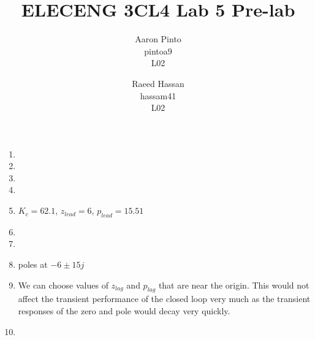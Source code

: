 \documentclass[12pt]{article}
\title{ELECENG 3CL4 Lab 5 Pre-lab}
\author{
    Aaron Pinto \\
    pintoa9 \\
    L02
    \and
    Raeed Hassan \\
    hassam41 \\
    L02
}
\begin{document}
\maketitle
\clearpage

\begin{enumerate}
	\item %

	\item %
	
	\item %
	
	\item %
	
	\item %
	$K_c = 62.1$, $z_{lead} = 6$, $p_{lead} = 15.51$
	
	\item %
	
	\item %

	\item %
	poles at $-6 \pm 15j$
	
	\item %
	We can choose values of $z_{lag}$ and $p_{lag}$ that are near the origin. This would not affect the transient performance of the closed loop very much as the transient responses of the zero and pole would decay very quickly. 
	
	\item %
	
\end{enumerate}
\end{document}
